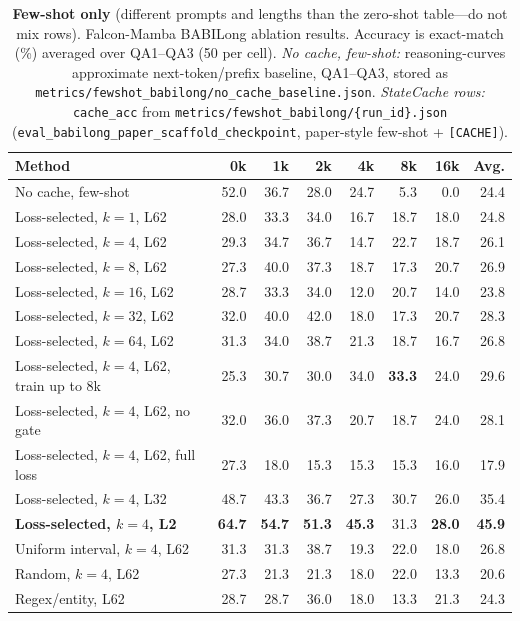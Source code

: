 \begin{table}[t]
\centering
\small
\setlength{\tabcolsep}{4pt}
\caption{\textbf{Few-shot only} (different prompts and lengths than the zero-shot table---do not mix rows). Falcon-Mamba BABILong ablation results. Accuracy is exact-match (\%) averaged over QA1--QA3 (50 per cell). \emph{No cache, few-shot:} reasoning-curves approximate next-token/prefix baseline, QA1--QA3, stored as \texttt{metrics/fewshot\_babilong/no\_cache\_baseline.json}. \emph{StateCache rows:} \texttt{cache\_acc} from \texttt{metrics/fewshot\_babilong/\{run\_id\}.json} (\texttt{eval\_babilong\_paper\_scaffold\_checkpoint}, paper-style few-shot + \texttt{[CACHE]}).}
\label{tab:fewshot-babilong-ablation-results}
\begin{tabular}{lrrrrrrr}
\toprule
\textbf{Method} & \textbf{0k} & \textbf{1k} & \textbf{2k} & \textbf{4k} & \textbf{8k} & \textbf{16k} & \textbf{Avg.} \\
\midrule
No cache, few-shot & 52.0 & 36.7 & 28.0 & 24.7 & 5.3 & 0.0 & 24.4 \\
\midrule
Loss-selected, $k=1$, L62 & 28.0 & 33.3 & 34.0 & 16.7 & 18.7 & 18.0 & 24.8 \\
Loss-selected, $k=4$, L62 & 29.3 & 34.7 & 36.7 & 14.7 & 22.7 & 18.7 & 26.1 \\
Loss-selected, $k=8$, L62 & 27.3 & 40.0 & 37.3 & 18.7 & 17.3 & 20.7 & 26.9 \\
Loss-selected, $k=16$, L62 & 28.7 & 33.3 & 34.0 & 12.0 & 20.7 & 14.0 & 23.8 \\
Loss-selected, $k=32$, L62 & 32.0 & 40.0 & 42.0 & 18.0 & 17.3 & 20.7 & 28.3 \\
Loss-selected, $k=64$, L62 & 31.3 & 34.0 & 38.7 & 21.3 & 18.7 & 16.7 & 26.8 \\
Loss-selected, $k=4$, L62, train up to 8k & 25.3 & 30.7 & 30.0 & 34.0 & \textbf{33.3} & 24.0 & 29.6 \\
Loss-selected, $k=4$, L62, no gate & 32.0 & 36.0 & 37.3 & 20.7 & 18.7 & 24.0 & 28.1 \\
Loss-selected, $k=4$, L62, full loss & 27.3 & 18.0 & 15.3 & 15.3 & 15.3 & 16.0 & 17.9 \\
Loss-selected, $k=4$, L32 & 48.7 & 43.3 & 36.7 & 27.3 & 30.7 & 26.0 & 35.4 \\
\textbf{Loss-selected, $k=4$, L2} & \textbf{64.7} & \textbf{54.7} & \textbf{51.3} & \textbf{45.3} & 31.3 & \textbf{28.0} & \textbf{45.9} \\
Uniform interval, $k=4$, L62 & 31.3 & 31.3 & 38.7 & 19.3 & 22.0 & 18.0 & 26.8 \\
Random, $k=4$, L62 & 27.3 & 21.3 & 21.3 & 18.0 & 22.0 & 13.3 & 20.6 \\
Regex/entity, L62 & 28.7 & 28.7 & 36.0 & 18.0 & 13.3 & 21.3 & 24.3 \\
\bottomrule
\end{tabular}
\end{table}
